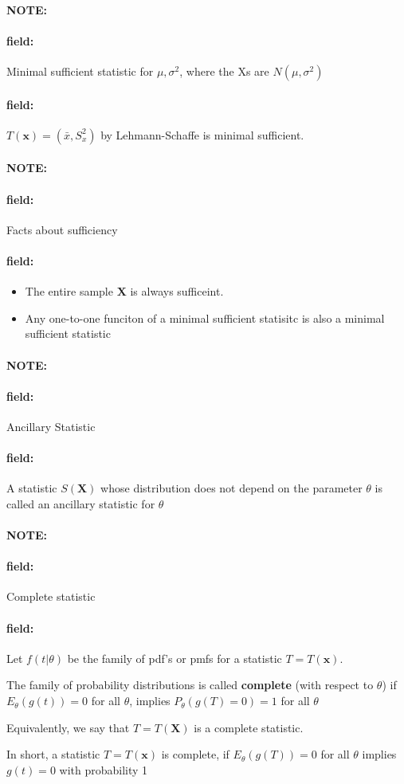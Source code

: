\documentclass[12pt]{article}
\newenvironment{note}{\paragraph{NOTE:}}{}
\newenvironment{field}{\paragraph{field:}}{}
\begin{document}
\begin{note}
  \begin{field}
    Minimal sufficient statistic for $\mu,\sigma^2$, where the Xs are $N(\mu,\sigma^2)$
  \end{field}
  \begin{field}
    $T(\mathbf{x}) = (\bar{x},S_x^2)$ by Lehmann-Schaffe is minimal sufficient.
  \end{field}
\end{note}

\begin{note}
  \begin{field}
    Facts about sufficiency
  \end{field}
  \begin{field}
    \begin{itemize}
      \item The entire sample $\mathbf{X}$ is always sufficeint.
      \item Any one-to-one funciton of a minimal sufficient statisitc is also a minimal sufficient statistic
    \end{itemize}
  \end{field}
\end{note}


\begin{note}
  \begin{field}
    Ancillary Statistic
  \end{field}
  \begin{field}
    A statistic $S(\mathbf{X})$ whose distribution does not depend on the parameter $\theta$ is called an ancillary statistic for $\theta$
  \end{field}
\end{note}



\begin{note}
  \begin{field}
    Complete statistic
  \end{field}
  \begin{field}
    Let $f(t|\theta)$ be the family of pdf's or pmfs for a statistic $T= T(\mathbf{x})$.

    The family of probability distributions is called \textbf{complete} (with respect to $\theta$) if $E_\theta(g(t)) = 0$ for all $\theta$, implies $P_\theta(g(T) = 0) = 1$ for all $\theta$

    Equivalently, we say that $T = T(\mathbf{X})$ is a complete statistic.

    In short, a statistic $T = T(\mathbf{x})$ is complete, if $E_\theta(g(T)) = 0$ for all $\theta$ implies $g(t) = 0$ with probability 1
  \end{field}
\end{note}
\end{document}
